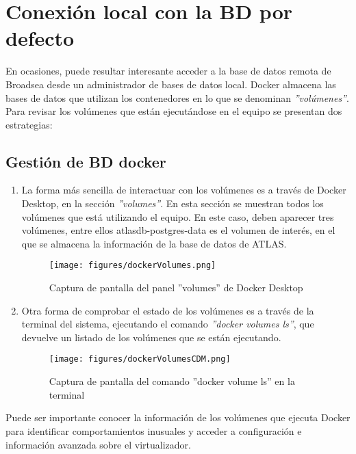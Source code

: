 \chapter{Conexión local con la BD por defecto}

En ocasiones, puede resultar interesante acceder a la base de datos remota de Broadsea desde un administrador de bases de datos local.  Docker almacena las bases de datos que utilizan los contenedores en lo que se denominan \textit{''volúmenes''}. Para revisar los volúmenes que están ejecutándose en el equipo se presentan dos estrategias:

\section{Gestión de BD docker}

\begin{enumerate}

    \item La forma más sencilla de interactuar con los volúmenes es a través de Docker Desktop, en la sección \textit{''volumes''}. En esta sección se muestran todos los volúmenes que está utilizando el equipo. En este caso, deben aparecer tres volúmenes, entre ellos atlasdb-postgres-data es el volumen de interés, en el que se almacena la información de la base de datos de ATLAS.

\begin{figure}[H]
    \centering
    \texttt{[image: figures/dockerVolumes.png]}
     \caption{Captura de pantalla del panel ''volumes'' de Docker Desktop}
    \label{fig:dockerVolumes}
\end{figure}

    \item Otra forma de comprobar el estado de los volúmenes es a través de la terminal del sistema, ejecutando el comando \textit{''docker volumes ls''}, que devuelve un listado de los volúmenes que se están ejecutando.
    
\begin{figure}[H]
    \centering
    \texttt{[image: figures/dockerVolumesCDM.png]}
     \caption{Captura de pantalla del comando ''docker volume ls'' en la terminal}
    \label{fig:dockerVolumesCDM}
\end{figure}
    
\end{enumerate}

Puede ser importante conocer la información de los volúmenes que ejecuta Docker para identificar comportamientos inusuales y acceder a configuración e información avanzada sobre el virtualizador. 

